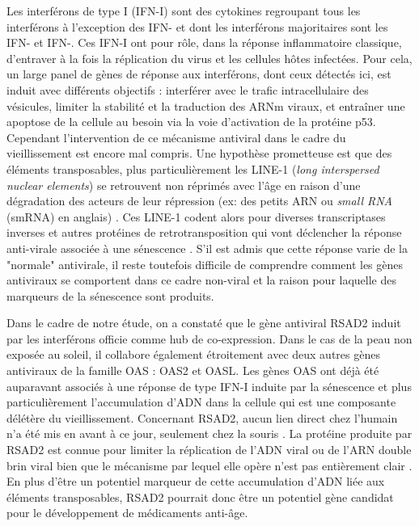 Les interférons de type I (IFN-I) sont des cytokines regroupant tous les interférons à l'exception des IFN-\textgamma{} et dont les interférons majoritaires sont les IFN-\textalpha{} et IFN-\textbeta{}. Ces IFN-I ont pour rôle, dans la réponse inflammatoire classique, d'entraver à la fois la réplication du virus et les cellules hôtes infectées. Pour cela, un large panel de gènes de réponse aux interférons, dont ceux détectés ici, est induit avec différents objectifs : interférer avec le trafic intracellulaire des vésicules, limiter la stabilité et la traduction des ARNm viraux, et entraîner une apoptose de la cellule au besoin via la voie d'activation de la protéine p53\cite{Frisch2020}. Cependant l'intervention de ce mécanisme antiviral dans le cadre du vieillissement est encore mal compris. Une hypothèse prometteuse est que des éléments transposables, plus particulièrement les LINE-1 (\textit{long interspersed nuclear elements}) se retrouvent non réprimés avec l'âge en raison d'une dégradation des acteurs de leur répression (ex: des petits ARN ou \textit{small RNA} (smRNA) en anglais) \cite{Kreiling2017Jan, DeCecco2019Feb, Frisch2020}. Ces LINE-1 codent alors pour diverses transcriptases inverses et autres protéines de retrotransposition qui vont déclencher la réponse anti-virale associée à une sénescence \cite{QiujingYu2015May}. S'il est admis que cette réponse varie de la "normale" antivirale, il reste toutefois difficile de comprendre comment les gènes antiviraux se comportent dans ce cadre non-viral \cite{Frisch2020} et la raison pour laquelle des marqueurs de la sénescence sont produits.

Dans le cadre de notre étude, on a constaté que le gène antiviral RSAD2 induit par les interférons officie comme hub de co-expression. Dans le cas de la peau non exposée au soleil, il collabore également étroitement avec deux autres gènes antiviraux de la famille OAS : OAS2 et OASL. Les gènes OAS ont déjà été auparavant associés à une réponse de type IFN-I induite par la sénescence et plus particulièrement l'accumulation d'ADN dans la cellule \cite{DeCecco2019Feb} qui est une composante délétère du vieillissement. Concernant RSAD2, aucun lien direct chez l'humain n'a été mis en avant à ce jour, seulement chez la souris \cite{Ma2020Mar}. La protéine produite par RSAD2 est connue pour limiter la réplication de l'ADN viral ou de l'ARN double brin viral bien que le mécanisme par lequel elle opère n'est pas entièrement clair \cite{Fitzgerald2011Jan}. En plus d'être un potentiel marqueur de cette accumulation d'ADN liée aux éléments transposables, RSAD2 pourrait donc être un potentiel gène candidat pour le développement de médicaments anti-âge.


